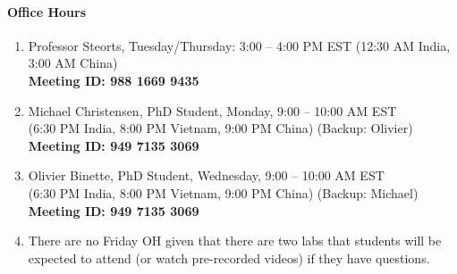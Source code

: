 \documentclass[11pt]{article}
\begin{document}
\paragraph{Office Hours}
\begin{enumerate}
\item Professor Steorts, Tuesday/Thursday: 3:00 -- 4:00 PM EST (12:30 AM India, 3:00 AM China) \\
\textbf{Meeting ID: 988 1669 9435}
\item Michael Christensen, PhD Student, Monday, 9:00 -- 10:00 AM EST \\(6:30 PM India, 8:00 PM Vietnam, 9:00 PM China) (Backup: Olivier)\\
\textbf{Meeting ID: 949 7135 3069}\\
\item Olivier Binette, PhD Student, Wednesday, 9:00 -- 10:00 AM EST \\(6:30 PM India, 8:00 PM Vietnam, 9:00 PM China) (Backup: Michael)\\
\textbf{Meeting ID: 949 7135 3069}\\
\item There are no Friday OH given that there are two labs that students will be expected to attend (or watch pre-recorded videos) if they have questions. 
\end{enumerate}





%
%
%
\end{document}
